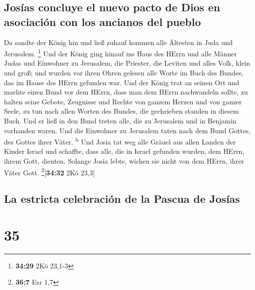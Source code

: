 \hypertarget{josuxedas-concluye-el-nuevo-pacto-de-dios-en-asociaciuxf3n-con-los-ancianos-del-pueblo}{%
\subsection{Josías concluye el nuevo pacto de Dios en asociación con los
ancianos del
pueblo}\label{josuxedas-concluye-el-nuevo-pacto-de-dios-en-asociaciuxf3n-con-los-ancianos-del-pueblo}}

 Da sandte der König hin und ließ zuhauf kommen alle
Ältesten in Juda und Jerusalem. \footnote{\textbf{34:29} 2Kö 23,1-3}
 Und der König ging hinauf ins Haus des HErrn und alle
Männer Judas und Einwohner zu Jerusalem, die Priester, die Leviten und
alles Volk, klein und groß; und wurden vor ihren Ohren gelesen alle
Worte im Buch des Bundes, das im Hause des HErrn gefunden war.
 Und der König trat an seinen Ort und machte einen Bund
vor dem HErrn, dass man dem HErrn nachwandeln sollte, zu halten seine
Gebote, Zeugnisse und Rechte von ganzem Herzen und von ganzer Seele, zu
tun nach allen Worten des Bundes, die gechrieben standen in diesem Buch.
 Und er ließ in den Bund treten alle, die zu Jerusalem
und in Benjamin vorhanden waren. Und die Einwohner zu Jerusalem taten
nach dem Bund Gottes, des Gottes ihrer Väter. \textsuperscript{b}
 Und Josia tat weg alle Gräuel aus allen Landen der
Kinder Israel und schaffte, dass alle, die in Israel gefunden wurden,
dem HErrn, ihrem Gott, dienten. Solange Josia lebte, wichen sie nicht
von dem HErrn, ihrer Väter Gott. \footnote{\textbf{36:7} Esr 1,7}{[}\textbf{34:32}
2Kö 23,3{]}

\hypertarget{la-estricta-celebraciuxf3n-de-la-pascua-de-josuxedas}{%
\subsection{La estricta celebración de la Pascua de
Josías}\label{la-estricta-celebraciuxf3n-de-la-pascua-de-josuxedas}}

\hypertarget{section-34}{%
\section{35}\label{section-34}}

